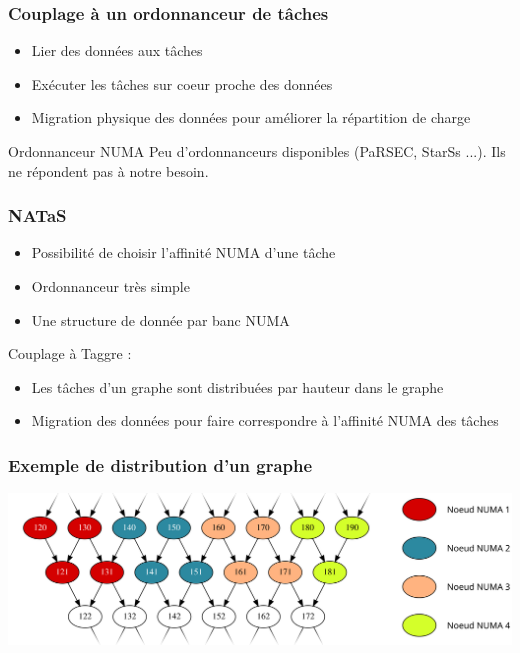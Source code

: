 \documentclass{beamer}
\begin{document}
\begin{frame}
  \frametitle{Couplage à un ordonnanceur de tâches}

  \begin{itemize}
    \item Lier des données aux tâches
    \item Exécuter les tâches sur coeur proche des données
    \item Migration physique des données pour améliorer la répartition de charge
  \end{itemize}

  \pause

  \begin{alertblock}{Ordonnanceur NUMA}
    Peu d'ordonnanceurs disponibles (PaRSEC, StarSs ...). Ils ne répondent pas à notre besoin.
  \end{alertblock}

\end{frame}



\begin{frame}
  \frametitle{NATaS}

  \begin{itemize}
    \item Possibilité de choisir l'affinité NUMA d'une tâche
    \item Ordonnanceur très simple
    \item Une structure de donnée par banc NUMA
  \end{itemize}

  \pause

  Couplage à Taggre :
  \begin{itemize}
    \item Les tâches d'un graphe sont distribuées par hauteur dans le graphe
    \item Migration des données pour faire correspondre à l'affinité NUMA des tâches
  \end{itemize}

\end{frame}

\begin{frame}
  \frametitle{Exemple de distribution d'un graphe}

  \centerline{\includegraphics[width=\linewidth]{numa_distrib_example}}

\end{frame}
\end{document}
